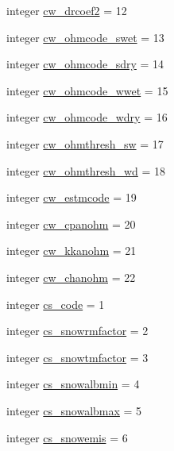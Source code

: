 \begin{DoxyCompactItemize}
integer \hyperlink{namespacecolnamesinputfiles_ac3abc75f657224540af00dce3e12c31a}{cw\+\_\+drcoef2} = 12
\item 
integer \hyperlink{namespacecolnamesinputfiles_af211aa34f46a1305707228ac39d36336}{cw\+\_\+ohmcode\+\_\+swet} = 13
\item 
integer \hyperlink{namespacecolnamesinputfiles_a5499ae70b69ed930772225c25bdbfda9}{cw\+\_\+ohmcode\+\_\+sdry} = 14
\item 
integer \hyperlink{namespacecolnamesinputfiles_ac191b5dba5f66714b5462d9b0f224a12}{cw\+\_\+ohmcode\+\_\+wwet} = 15
\item 
integer \hyperlink{namespacecolnamesinputfiles_ab05531176915209690e2e250c5628930}{cw\+\_\+ohmcode\+\_\+wdry} = 16
\item 
integer \hyperlink{namespacecolnamesinputfiles_a91c1cfc11c36cc14dc389c3664349b80}{cw\+\_\+ohmthresh\+\_\+sw} = 17
\item 
integer \hyperlink{namespacecolnamesinputfiles_a7c61afe733a883743d6acd47ad304165}{cw\+\_\+ohmthresh\+\_\+wd} = 18
\item 
integer \hyperlink{namespacecolnamesinputfiles_ab2ef5113c4b88c851e8380f8ba776c9f}{cw\+\_\+estmcode} = 19
\item 
integer \hyperlink{namespacecolnamesinputfiles_a72895e9c084cfee18f83ca866ff41964}{cw\+\_\+cpanohm} = 20
\item 
integer \hyperlink{namespacecolnamesinputfiles_aa5a9a495f9118eac239b3ab993cd3a0a}{cw\+\_\+kkanohm} = 21
\item 
integer \hyperlink{namespacecolnamesinputfiles_a3d8db86209697e2247d1053c33bbd801}{cw\+\_\+chanohm} = 22
\item 
integer \hyperlink{namespacecolnamesinputfiles_a1252e22c70ac9a8361c876e3a670d98b}{cs\+\_\+code} = 1
\item 
integer \hyperlink{namespacecolnamesinputfiles_a40dacb0faac015e28c7aca1d922a2573}{cs\+\_\+snowrmfactor} = 2
\item 
integer \hyperlink{namespacecolnamesinputfiles_a5b893589e831ca1ee86ff6450bc194b7}{cs\+\_\+snowtmfactor} = 3
\item 
integer \hyperlink{namespacecolnamesinputfiles_a6a42003295839c9ac986d8d3dc5f0f8f}{cs\+\_\+snowalbmin} = 4
\item 
integer \hyperlink{namespacecolnamesinputfiles_a77a8855e90b784c501216ca710b7ad17}{cs\+\_\+snowalbmax} = 5
\item 
integer \hyperlink{namespacecolnamesinputfiles_a9978a0f122304a4b30c14876c95ff5c8}{cs\+\_\+snowemis} = 6
\item 

\end{DoxyCompactItemize}
